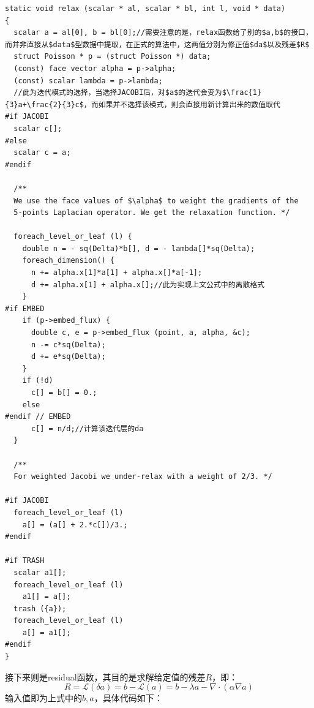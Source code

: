 \documentclass[lang=cn,11pt,a4paper]{elegantpaper}
\begin{document}
\begin{verbatim}
static void relax (scalar * al, scalar * bl, int l, void * data)
{
  scalar a = al[0], b = bl[0];//需要注意的是，relax函数给了别的$a,b$的接口，而并非直接从$data$型数据中提取，在正式的算法中，这两值分别为修正值$da$以及残差$R$
  struct Poisson * p = (struct Poisson *) data;
  (const) face vector alpha = p->alpha;
  (const) scalar lambda = p->lambda;
  //此为迭代模式的选择，当选择JACOBI后，对$a$的迭代会变为$\frac{1}{3}a+\frac{2}{3}c$，而如果并不选择该模式，则会直接用新计算出来的数值取代
#if JACOBI
  scalar c[];
#else
  scalar c = a;
#endif
  
  /**
  We use the face values of $\alpha$ to weight the gradients of the
  5-points Laplacian operator. We get the relaxation function. */

  foreach_level_or_leaf (l) {
    double n = - sq(Delta)*b[], d = - lambda[]*sq(Delta);
    foreach_dimension() {
      n += alpha.x[1]*a[1] + alpha.x[]*a[-1];
      d += alpha.x[1] + alpha.x[];//此为实现上文公式中的离散格式
    }
#if EMBED
    if (p->embed_flux) {
      double c, e = p->embed_flux (point, a, alpha, &c);
      n -= c*sq(Delta);
      d += e*sq(Delta);
    }
    if (!d)
      c[] = b[] = 0.;
    else
#endif // EMBED
      c[] = n/d;//计算该迭代层的da
  }

  /**
  For weighted Jacobi we under-relax with a weight of 2/3. */
  
#if JACOBI
  foreach_level_or_leaf (l)
    a[] = (a[] + 2.*c[])/3.;
#endif
  
#if TRASH
  scalar a1[];
  foreach_level_or_leaf (l)
    a1[] = a[];
  trash ({a});
  foreach_level_or_leaf (l)
    a[] = a1[];
#endif
}
\end{verbatim}
接下来则是residual函数，其目的是求解给定值的残差$R$，即：
\begin{equation}
    R = \mathscr{L}(\delta a) = b - \mathscr{L}(a) = b -\lambda a -\nabla\cdot(\alpha \nabla a)
\end{equation}
输入值即为上式中的$b, a$，具体代码如下：
\end{document}
